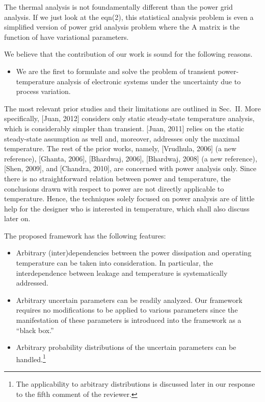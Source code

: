 \begin{reviewer}
[Comment 2] The thermal analysis is not foundamentally different than the power grid analysis.  If we just look at the eqn(2), this statistical analysis problem is even a simplified version of power grid analysis problem where the A matrix is the function of have variational parameters.
\end{reviewer}
\begin{authors}
We believe that the contribution of our work is sound for the following reasons.
\begin{itemize}
  \item[(R1)] We are the first to formulate and solve the problem of transient power-temperature analysis of electronic systems under the uncertainty due to process variation.
\end{itemize}
The most relevant prior studies and their limitations are outlined in Sec.~II.
More specifically, [Juan, 2012] considers only static steady-state temperature analysis, which is considerably simpler than transient.
[Juan, 2011] relies on the static steady-state assumption as well and, moreover, addresses only the maximal temperature.
The rest of the prior works, namely, [Vrudhula, 2006] (a new reference), [Ghanta, 2006], [Bhardwaj, 2006], [Bhardwaj, 2008] (a new reference), [Shen, 2009], and [Chandra, 2010], are concerned with power analysis only.
Since there is no straightforward relation between power and temperature, the conclusions drawn with respect to power are not directly applicable to temperature.
Hence, the techniques solely focused on power analysis are of little help for the designer who is interested in temperature, which shall also discuss later on.

The proposed framework has the following features:
\begin{itemize}
  \item[1.] Arbitrary (inter)dependencies between the power dissipation and operating temperature can be taken into consideration.
  In particular, the interdependence between leakage and temperature is systematically addressed.

  \item[2.] Arbitrary uncertain parameters can be readily analyzed.
  Our framework requires no modifications to be applied to various parameters since the manifestation of these parameters is introduced into the framework as a ``black box.''

  \item[3.] Arbitrary probability distributions of the uncertain parameters can be handled.\footnote{The applicability to arbitrary distributions is discussed later in our response to the fifth comment of the reviewer.}


\end{itemize}
\end{authors}
